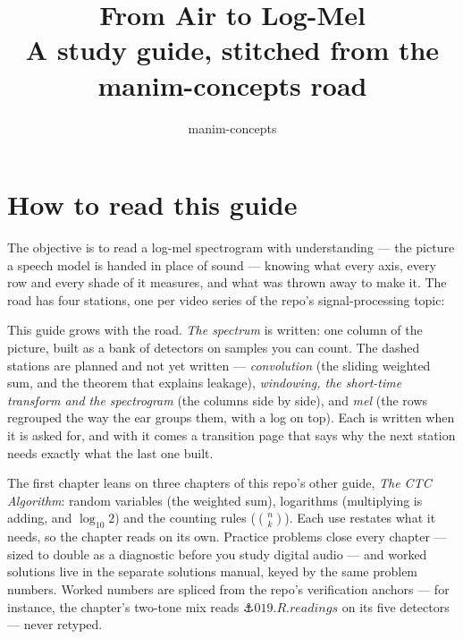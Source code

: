 \documentclass[11pt]{report}
\title{From Air to Log-Mel\\[0.4em]
  \large A study guide, stitched from the manim-concepts road}
\author{manim-concepts}
\date{}
\begin{document}
\maketitle
\tableofcontents

\chapter*{How to read this guide}
The objective is to read a log-mel spectrogram with understanding — the
picture a speech model is handed in place of sound — knowing what every
axis, every row and every shade of it measures, and what was thrown
away to make it. The road has four stations, one per video series of
the repo's signal-processing topic:


\noindent This guide grows with the road. \emph{The spectrum} is
written: one column of the picture, built as a bank of detectors on
samples you can count. The dashed stations are planned and not yet
written — \emph{convolution} (the sliding weighted sum, and the theorem
that explains leakage), \emph{windowing, the short-time transform and
the spectrogram} (the columns side by side), and \emph{mel} (the rows
regrouped the way the ear groups them, with a log on top). Each is
written when it is asked for, and with it comes a transition page that
says why the next station needs exactly what the last one built.

The first chapter leans on three chapters of this repo's other guide,
\emph{The CTC Algorithm}: random variables (the weighted sum),
logarithms (multiplying is adding, and $\log_{10} 2$) and the counting
rules ($\binom{n}{k}$). Each use restates what it needs, so the chapter
reads on its own. Practice problems close every chapter — sized to
double as a diagnostic before you study digital audio — and worked
solutions live in the separate solutions manual, keyed by the same
problem numbers. Worked numbers are spliced from the repo's
verification anchors — for instance, the chapter's two-tone mix reads
$\anchor{019.R.readings}$ on its five detectors — never retyped.



\printbibliography[heading=bibintoc]
\end{document}
